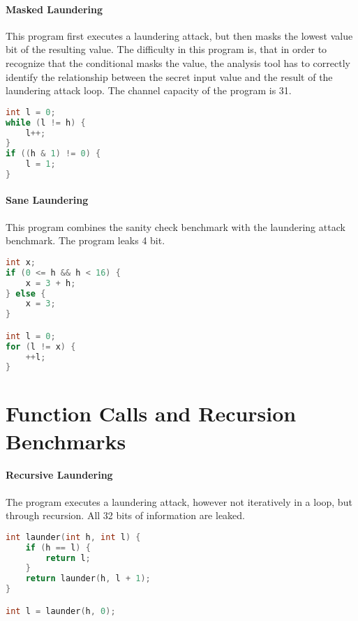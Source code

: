 \paragraph{Masked Laundering} This program first executes a laundering attack, but then masks the lowest value bit of the resulting value. The difficulty in this program is, that in order to recognize that the conditional masks the value, the analysis tool has to correctly identify the relationship between the secret input value and the result of the laundering attack loop. The channel capacity of the program is 31.

\begin{center}
    \begin{lstlisting}[language=C, caption=Masked Laundering, captionpos=b]
int l = 0;
while (l != h) {
	l++;
}
if ((h & 1) != 0) {
	l = 1;
}
    \end{lstlisting}
\end{center}

\paragraph{Sane Laundering} This program combines the sanity check benchmark with the laundering attack benchmark. The program leaks 4 bit.

\begin{center}
    \begin{lstlisting}[language=C, caption=Sane Laundering, captionpos=b]
int x;
if (0 <= h && h < 16) {
	x = 3 + h;
} else {
	x = 3;
}

int l = 0;
for (l != x) {
	++l;
}
    \end{lstlisting}
\end{center}

\section{Function Calls and Recursion Benchmarks}

\paragraph{Recursive Laundering} The program executes a laundering attack, however not iteratively in a loop, but through recursion. All 32 bits of information are leaked.

\begin{center}
    \begin{lstlisting}[language=C, caption=Recursive Laundering, captionpos=b]
int launder(int h, int l) {
    if (h == l) {
    	return l;
    }
    return launder(h, l + 1);
}

int l = launder(h, 0);
    \end{lstlisting}
\end{center}


